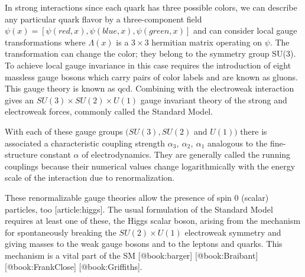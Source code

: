 
In strong interactions since each quark has three possible colors, we can describe any particular quark flavor by a three-component field $\psi(x)=[\psi(red,x),\psi(blue,x),\psi(green,x)]$ and can consider local gauge transformations where $\Lambda(x)$ is a $3\times 3$ hermitian matrix operating on $\psi$. The transformation can change the color; they belong to the symmetry group SU(3). To achieve local gauge invariance in this case requires the introduction of eight massless gauge bosons which carry pairs of color labels and are known as gluons. This gauge theory is known as {qcd}. Combining with the electroweak interaction gives an $SU(3)\times SU(2) \times U(1)$ gauge invariant theory of the strong and electroweak forces, commonly called the Standard Model.

With each of these gauge groups $(SU(3),SU(2)$ and $U(1))$ there is associated a characteristic coupling strength $\alpha_3,~\alpha_2,~\alpha_1$ analogous to the fine-structure constant $\alpha$ of electrodynamics. They are generally called the running couplings because their numerical values change logarithmically with the energy scale of the interaction due to renormalization.

These renormalizable gauge theories allow the presence of spin 0 (scalar) particles, too [article:higgs]. The usual formulation of the Standard Model requires at least one of these, the Higgs scalar boson, arising from the mechanism for spontaneously breaking the $SU(2)\times U(1)$ electroweak symmetry and giving masses to the weak gauge bosons and to the leptons and quarks. This mechanism is a vital part of the SM [@book:barger] [@book:Braibant] [@book:FrankClose] [@book:Griffiths].


